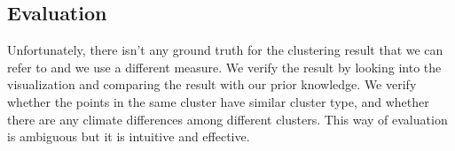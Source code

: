 \subsection{Evaluation}
Unfortunately, there isn't any ground truth for the clustering result that we can refer to and we use a different measure. We verify the result by looking into the visualization and comparing the result with our prior knowledge. We verify whether the points in the same cluster have similar cluster type, and whether there are any climate differences among different clusters. This way of evaluation is ambiguous but it is intuitive and effective.
